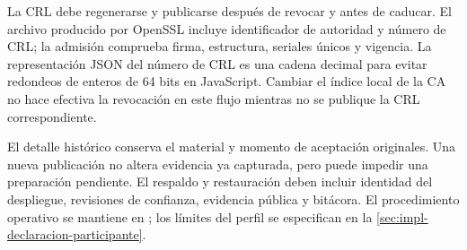 La CRL debe regenerarse y publicarse después de revocar y antes de caducar. El archivo producido por OpenSSL incluye identificador de autoridad y número de CRL; la admisión comprueba firma, estructura, seriales únicos y vigencia. La representación JSON del número de CRL es una cadena decimal para evitar redondeos de enteros de 64 bits en JavaScript. Cambiar el índice local de la CA no hace efectiva la revocación en este flujo mientras no se publique la CRL correspondiente.

El detalle histórico conserva el material y momento de aceptación originales. Una nueva publicación no altera evidencia ya capturada, pero puede impedir una preparación pendiente. El respaldo y restauración deben incluir identidad del despliegue, revisiones de confianza, evidencia pública y bitácora. El procedimiento operativo se mantiene en ; los límites del perfil se especifican en la \cref{sec:impl-declaracion-participante}.

